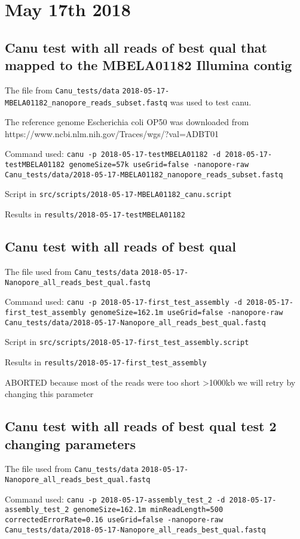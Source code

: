 \documentclass[10pt,a4paper]{article}
\begin{document}
\section{May 17th 2018}

\subsection{Canu test with all reads of best qual that mapped to the MBELA01182 Illumina contig}
The file from \verb!Canu_tests/data!
 \verb!2018-05-17-MBELA01182_nanopore_reads_subset.fastq! was used to test canu.

The reference genome Escherichia coli OP50 was downloaded from https://www.ncbi.nlm.nih.gov/Traces/wgs/?val=ADBT01 

Command used:
 \verb!canu -p 2018-05-17-testMBELA01182 -d 2018-05-17-testMBELA01182 genomeSize=57k useGrid=false -nanopore-raw Canu_tests/data/2018-05-17-MBELA01182_nanopore_reads_subset.fastq!

Script in  \verb!src/scripts/2018-05-17-MBELA01182_canu.script!

Results in \texttt{results/2018-05-17-testMBELA01182}

\subsection{Canu test with all reads of best qual}
The file used from  \verb!Canu_tests/data!
 \verb!2018-05-17-Nanopore_all_reads_best_qual.fastq!

Command used:
 \verb!canu -p 2018-05-17-first_test_assembly -d 2018-05-17-first_test_assembly genomeSize=162.1m useGrid=false -nanopore-raw Canu_tests/data/2018-05-17-Nanopore_all_reads_best_qual.fastq!

Script in  \verb!src/scripts/2018-05-17-first_test_assembly.script!

Results in  \verb!results/2018-05-17-first_test_assembly!

ABORTED because most of the reads were too short >1000kb we will retry by changing this parameter

\subsection{Canu test with all reads of best qual test 2 changing parameters}
The file used from  \verb!Canu_tests/data!
  \verb!2018-05-17-Nanopore_all_reads_best_qual.fastq!

Command used:
 \verb!canu -p 2018-05-17-assembly_test_2 -d 2018-05-17-assembly_test_2 genomeSize=162.1m minReadLength=500 correctedErrorRate=0.16 useGrid=false -nanopore-raw Canu_tests/data/2018-05-17-Nanopore_all_reads_best_qual.fastq!
\end{document}
